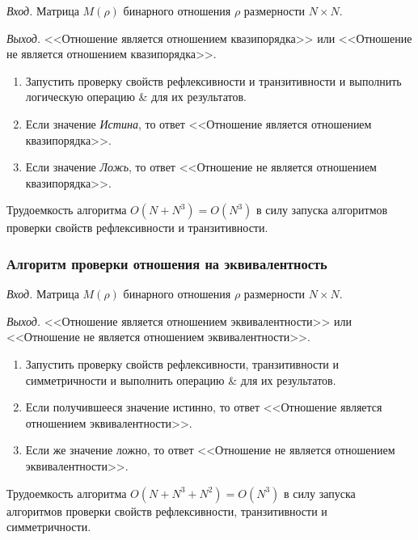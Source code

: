 \documentclass[bachelor, och, labwork]{shiza}
\begin{document}
\textit{Вход.} Матрица $M(\rho)$ бинарного отношения $\rho$ размерности
$N \times N$.

\textit{Выход.} <<Отношение является отношением квазипорядка>> или <<Отношение 
не является отношением квазипорядка>>.

\begin{enumerate}

    \item Запустить проверку свойств рефлексивности и транзитивности и выполнить
    логическую операцию \& для их результатов.

    \item Если значение \textit{Истина}, то ответ <<Отношение является отношением
    квазипорядка>>.
    
    \item Если значение \textit{Ложь}, то ответ <<Отношение не является 
    отношением квазипорядка>>.

\end{enumerate}
Трудоемкость алгоритма $O(N+N^3) = O(N^3)$ в силу запуска алгоритмов проверки
свойств рефлексивности и транзитивности.

\subsubsection{Алгоритм проверки отношения на эквивалентность}

\textit{Вход.} Матрица $M(\rho)$ бинарного отношения $\rho$ размерности
$N \times N$.


\textit{Выход.} <<Отношение является отношением эквивалентности>> или 
<<Отношение не является отношением эквивалентности>>.

\begin{enumerate}

    \item Запустить проверку свойств рефлексивности, транзитивности и симметричности
    и выполнить операцию \& для их результатов.

    \item Если получившееся значение истинно, то ответ <<Отношение является
    отношением эквивалентности>>.

    \item Если же значение ложно, то ответ <<Отношение не является отношением
    эквивалентности>>. 

\end{enumerate}
Трудоемкость алгоритма $O(N+N^3+N^2) = O(N^3)$ в силу запуска алгоритмов проверки
свойств рефлексивности, транзитивности и симметричности.
\end{document}
